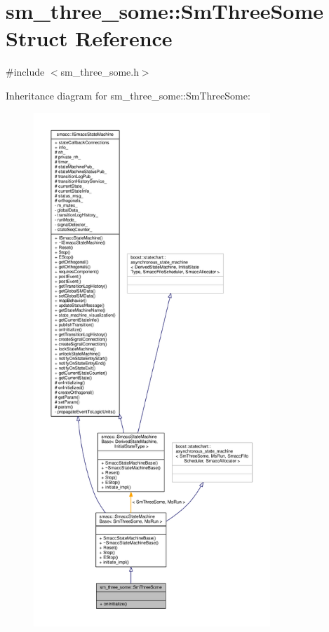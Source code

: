 \hypertarget{structsm__three__some_1_1SmThreeSome}{}\section{sm\+\_\+three\+\_\+some\+:\+:Sm\+Three\+Some Struct Reference}
\label{structsm__three__some_1_1SmThreeSome}


{\ttfamily \#include $<$sm\+\_\+three\+\_\+some.\+h$>$}



Inheritance diagram for sm\+\_\+three\+\_\+some\+:\+:Sm\+Three\+Some\+:\nopagebreak
\begin{figure}[H]
\begin{center}
\leavevmode
\includegraphics[height=550pt]{structsm__three__some_1_1SmThreeSome__inherit__graph}
\end{center}
\end{figure}


